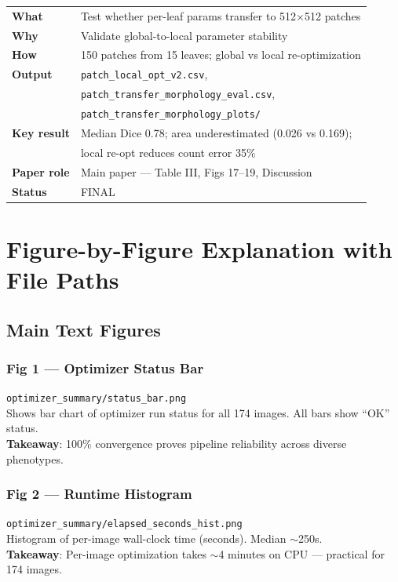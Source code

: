 \documentclass[11pt,a4paper]{article}
\newcommand{\filepath}[1]{\texttt{\small #1}}
\begin{document}
\begin{tabular}{ll}
\toprule
\textbf{What} & Test whether per-leaf params transfer to 512$\times$512 patches \\
\textbf{Why} & Validate global-to-local parameter stability \\
\textbf{How} & 150 patches from 15 leaves; global vs local re-optimization \\
\textbf{Output} & \filepath{patch\_local\_opt\_v2.csv}, \\
 & \filepath{patch\_transfer\_morphology\_eval.csv}, \\
 & \filepath{patch\_transfer\_morphology\_plots/} \\
\textbf{Key result} & Median Dice 0.78; area underestimated (0.026 vs 0.169); \\
 & local re-opt reduces count error 35\% \\
\textbf{Paper role} & Main paper --- Table III, Figs 17--19, Discussion \\
\textbf{Status} & FINAL \\
\bottomrule
\end{tabular}

\section{Figure-by-Figure Explanation with File Paths}

\subsection{Main Text Figures}

\subsubsection{Fig 1 --- Optimizer Status Bar}
\filepath{optimizer\_summary/status\_bar.png}\\
Shows bar chart of optimizer run status for all 174 images.  All bars show ``OK'' status.\\
\textbf{Takeaway}: 100\% convergence proves pipeline reliability across diverse phenotypes.

\subsubsection{Fig 2 --- Runtime Histogram}
\filepath{optimizer\_summary/elapsed\_seconds\_hist.png}\\
Histogram of per-image wall-clock time (seconds).  Median $\sim$250s.\\
\textbf{Takeaway}: Per-image optimization takes $\sim$4 minutes on CPU --- practical for 174 images.
\end{document}
